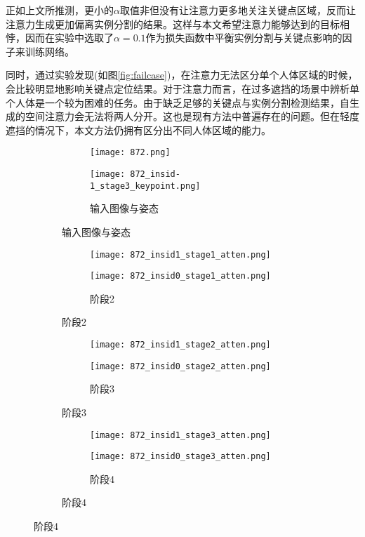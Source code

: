 正如上文所推测，更小的$\alpha$取值非但没有让注意力更多地关注关键点区域，反而让注意力生成更加偏离实例分割的结果。这样与本文希望注意力能够达到的目标相悖，因而在实验中选取了$\alpha=0.1$作为损失函数中平衡实例分割与关键点影响的因子来训练网络。

同时，通过实验发现(如图\ref{fig:failcase})，在注意力无法区分单个人体区域的时候，会比较明显地影响关键点定位结果。对于注意力而言，在过多遮挡的场景中辨析单个人体是一个较为困难的任务。由于缺乏足够的关键点与实例分割检测结果，自生成的空间注意力会无法将两人分开。这也是现有方法中普遍存在的问题。但在轻度遮挡的情况下，本文方法仍拥有区分出不同人体区域的能力。

\begin{figure}[H]
	\centering
	\begin{subfigure}[t]{0.22\textwidth}
		\centering
		\begin{subfigure}[t]{\linewidth}
			\texttt{[image: 872.png]}
		\end{subfigure}
		\vskip2pt
		\begin{subfigure}[t]{\linewidth}
			\texttt{[image: 872\_insid-1\_stage3\_keypoint.png]}
			\caption{输入图像与姿态}
		\end{subfigure}
	\end{subfigure}
	\begin{subfigure}[t]{0.22\textwidth}
		\centering
		\begin{subfigure}[t]{\linewidth}
			\texttt{[image: 872\_insid1\_stage1\_atten.png]}
		\end{subfigure}
		\vskip2pt
		\begin{subfigure}[t]{\linewidth}
			\texttt{[image: 872\_insid0\_stage1\_atten.png]}
			\caption{阶段2}
		\end{subfigure}
	\end{subfigure}
	\begin{subfigure}[t]{0.22\textwidth}
		\centering
		\begin{subfigure}[t]{\linewidth}
			\texttt{[image: 872\_insid1\_stage2\_atten.png]}
		\end{subfigure}
		\vskip2pt
		\begin{subfigure}[t]{\linewidth}
			\texttt{[image: 872\_insid0\_stage2\_atten.png]}
			\caption{阶段3}
		\end{subfigure}
	\end{subfigure}
	\begin{subfigure}[t]{0.22\textwidth}
		\centering
		\begin{subfigure}[t]{\linewidth}
			\texttt{[image: 872\_insid1\_stage3\_atten.png]}
		\end{subfigure}
		\vskip2pt
		\begin{subfigure}[t]{\linewidth}
			\texttt{[image: 872\_insid0\_stage3\_atten.png]}
			\caption{阶段4}
		\end{subfigure}
	\end{subfigure}
	\begin{minipage}{0.05\linewidth}
		

\end{minipage}
\end{figure}

